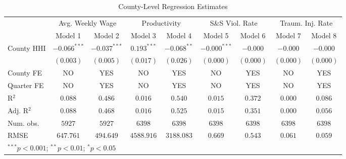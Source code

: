 
\begin{table}[H]
\begin{center}
\begin{tabular}{l c c c c c c c c}
\hline
 & \multicolumn{2}{c}{Avg. Weekly Wage} & \multicolumn{2}{c}{Productivity} & \multicolumn{2}{c}{S\&S Viol. Rate} & \multicolumn{2}{c}{Traum. Inj. Rate} \\
\cline{2-3} \cline{4-5} \cline{6-7} \cline{8-9}
 & Model 1 & Model 2 & Model 3 & Model 4 & Model 5 & Model 6 & Model 7 & Model 8 \\
\hline
County HHI & $-0.066^{***}$ & $-0.037^{***}$ & $0.193^{***}$ & $-0.068^{**}$ & $-0.000^{***}$ & $-0.000$  & $-0.000$  & $-0.000$  \\
           & $(0.003)$      & $(0.005)$      & $(0.017)$     & $(0.026)$     & $(0.000)$      & $(0.000)$ & $(0.000)$ & $(0.000)$ \\
\hline
County FE  & NO             & YES            & NO            & YES           & NO             & YES       & NO        & YES       \\
Quarter FE & NO             & YES            & NO            & YES           & NO             & YES       & NO        & YES       \\
R$^2$      & $0.088$        & $0.486$        & $0.016$       & $0.540$       & $0.015$        & $0.372$   & $0.000$   & $0.086$   \\
Adj. R$^2$ & $0.088$        & $0.468$        & $0.016$       & $0.525$       & $0.015$        & $0.351$   & $0.000$   & $0.056$   \\
Num. obs.  & $5927$         & $5927$         & $6398$        & $6398$        & $6398$         & $6398$    & $6398$    & $6398$    \\
RMSE       & $647.761$      & $494.649$      & $4588.916$    & $3188.083$    & $0.669$        & $0.543$   & $0.061$   & $0.059$   \\
\hline
\multicolumn{9}{l}{\scriptsize{$^{***}p<0.001$; $^{**}p<0.01$; $^{*}p<0.05$}}
\end{tabular}
\caption{County-Level Regression Estimates}
\label{ols_hhi_county}
\end{center}
\end{table}

